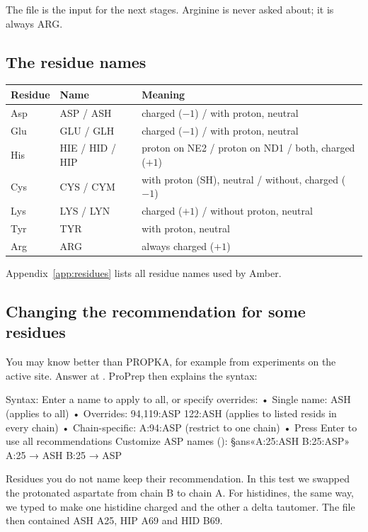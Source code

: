 The file  is the input for the next stages.
Arginine is never asked about; it is always ARG.

\subsection{The residue names}

\begin{tabularx}{\linewidth}{@{}llL@{}}
\toprule
\textbf{Residue} & \textbf{Name} & \textbf{Meaning} \\
\midrule
Asp & ASP / ASH & charged ($-1$) / with proton, neutral \\
Glu & GLU / GLH & charged ($-1$) / with proton, neutral \\
His & HIE / HID / HIP & proton on NE2 / proton on ND1 / both, charged ($+1$) \\
Cys & CYS / CYM & with proton (SH), neutral / without, charged ($-1$) \\
Lys & LYS / LYN & charged ($+1$) / without proton, neutral \\
Tyr & TYR & with proton, neutral \\
Arg & ARG & always charged ($+1$) \\
\bottomrule
\end{tabularx}

\medskip
Appendix~\ref{app:residues} lists all residue names used by Amber.

\subsection{Changing the recommendation for some residues}
\label{sec:protonation-override}

You may know better than PROPKA, for example from experiments on the active
site. Answer  at . ProPrep then explains the syntax:
\begin{screen}
Syntax: Enter a name to apply to all, or specify overrides:
  • Single name: ASH (applies to all)
  • Overrides: 94,119:ASP 122:ASH (applies to listed resids in every chain)
  • Chain-specific: A:94:ASP (restrict to one chain)
  • Press Enter to use all recommendations
Customize ASP names (): §ans«A:25:ASH B:25:ASP»
  A:25 → ASH
  B:25 → ASP
\end{screen}
Residues you do not name keep their recommendation. In this test we swapped the
protonated aspartate from chain B to chain A. For histidines, the same way, we
typed  to make one histidine charged and the other a
delta tautomer. The file then contained ASH A25, HIP A69 and HID B69.

